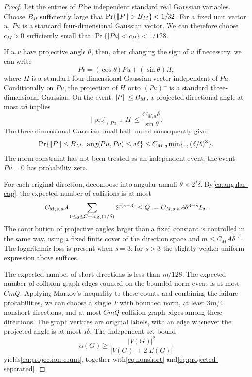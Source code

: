 \begin{proof}
Let the entries of $P$ be independent standard real Gaussian variables.
Choose $B_M$ sufficiently large that $\Pr\{\left\lVert P\right\rVert>B_M\}<1/32$.
For a fixed unit vector $u$, $Pu$ is a standard four-dimensional Gaussian vector.
We can therefore choose $c_M>0$ sufficiently small that $\Pr\{|Pu|<c_M\}<1/128$.

If $u,v$ have projective angle $\theta$, then, after changing the sign of $v$ if necessary, we can write
\[
 Pv=(\cos\theta)Pu+(\sin\theta)H,
\]
where $H$ is a standard four-dimensional Gaussian vector independent of $Pu$.
Conditionally on $Pu$, the projection of $H$ onto $(Pu)^\perp$ is a standard three-dimensional Gaussian.
On the event $\left\lVert P\right\rVert\le B_M$, a projected directional angle at most $a\delta$ implies
\[
 \big|\operatorname{proj}_{(Pu)^\perp}H\big|
 \le \frac{C_{M,a}\delta}{\sin\theta}.
\]
The three-dimensional Gaussian small-ball bound consequently gives
\begin{equation}\label{eq:collision-probability}
 \Pr\{\left\lVert P\right\rVert\le B_M,\ \operatorname{ang}(Pu,Pv)\le a\delta\}
 \le C_{M,a}\min\{1,(\delta/\theta)^3\}.
\end{equation}
The norm constraint has not been treated as an independent event; the event $Pu=0$ has probability zero.

For each original direction, decompose into angular annuli $\theta\asymp2^j\delta$.
By\eqref{eq:angular-cap}, the expected number of collisions is at most
\begin{equation}\label{eq:collision-degree}
 C_{M,s,a}A\sum_{0\le j\le C+\log_2(1/\delta)}2^{j(s-3)}
 \le Q:=C_{M,s,a}A\delta^{3-s}L_\delta.
\end{equation}
The contribution of projective angles larger than a fixed constant is controlled in the same way,
using a fixed finite cover of the direction space and $m\le C_MA\delta^{-s}$.
The logarithmic loss is present when $s=3$; for $s>3$ the slightly weaker uniform expression above suffices.

The expected number of short directions is less than $m/128$.
The expected number of collision-graph edges counted on the bounded-norm event is at most $CmQ$.
Applying Markov's inequality to these counts and combining the failure probabilities,
we can choose a single $P$ with bounded norm, at least $3m/4$ nonshort directions,
and at most $CmQ$ collision-graph edges among these directions.
The graph vertices are original labels, with an edge whenever the projected angle is at most $a\delta$.
The independent-set bound
\[
 \alpha(G)\ge\frac{|V(G)|^2}{|V(G)|+2|E(G)|}
\]
yields\eqref{eq:projection-count}, together with\eqref{eq:nonshort} and\eqref{eq:projected-separated}.
\end{proof}

